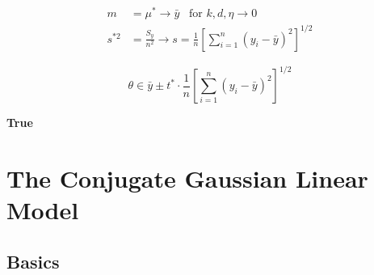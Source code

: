 \documentclass[10pt]{article}
\begin{document}
\begin{enumerate}[label=(\Alph*)]
        \begin{align*}
          m &= \mu^* \rightarrow \bar{y} \hspace{10pt} \text{for $k, d, \eta \to 0$} \\
          s^{*2} &= \frac{S_y}{n^2} \rightarrow s = \frac{1}{n} \left[\sum_{i=1}^n(y_i - \bar{y})^2 \right]^{1/2}
        \end{align*}

        $$\theta \in \bar{y} \pm t^* \cdot \frac{1}{n} \left[\sum_{i=1}^n(y_i - \bar{y})^2 \right]^{1/2}$$

        \textbf{True}
    \end{enumerate}

    \clearpage

    \section*{The Conjugate Gaussian Linear Model}

    \subsection*{Basics}
\end{document}
